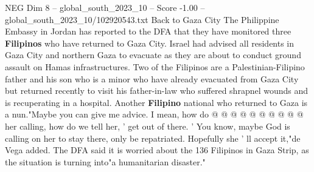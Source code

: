 \begin{textsample}{NEG Dim 8 – global\_south\_2023\_10 – Score -1.00 – global\_south\_2023\_10/102920543.txt}
Back to Gaza City The Philippine Embassy in Jordan has reported to the DFA that they have monitored three \textbf{Filipinos} who have returned to Gaza City.
Israel had advised all residents in Gaza City and northern Gaza to evacuate as they are about to conduct ground assault on Hamas infrastructures.
Two of the Filipinos are a Palestinian-Filipino father and his son who is a minor who have already evacuated from Gaza City but returned recently to visit his father-in-law who suffered shrapnel wounds and is recuperating in a hospital.
Another \textbf{Filipino} national who returned to Gaza is a nun."Maybe you can give me advice.
I mean, how do @ @ @ @ @ @ @ @ @ @ her calling, how do we tell her, ' get out of there. ' You know, maybe God is calling on her to stay there, only be repatriated.
Hopefully she ' ll accept it,"de Vega added.
The DFA said it is worried about the 136 Filipinos in Gaza Strip, as the situation is turning into"a humanitarian disaster."

\end{textsample}
